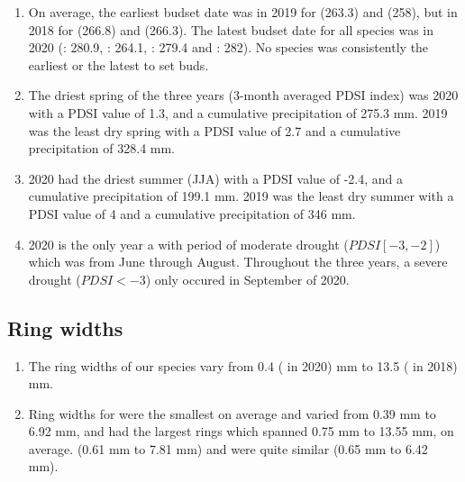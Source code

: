 \documentclass{article}\usepackage[]{graphicx}\usepackage[]{xcolor}
\begin{document}
\begin{enumerate}
\item On average, the earliest budset date was in 2019 for {\Ainc} 
(263.3) and 
{\Ball} (258), but in 2018 for
{\Bpap} (266.8) and 
{\Bpop} (266.3). 
The latest budset date for all species was in 2020
({\Ainc}: 280.9, 
{\Ball}: 264.1, 
{\Bpap}: 279.4 and 
{\Bpop}: 282).
No species was consistently the earliest or the latest to set buds.

\item The driest spring of the three years (3-month averaged PDSI index) was
2020 with a PDSI value of 
1.3, and a cumulative precipitation of 
275.3 mm.
2019 was the least dry spring with a PDSI value of 
2.7 and a cumulative precipitation of 328.4 mm.

\item 2020 had the driest summer (JJA) with a PDSI value of 
-2.4, and a cumulative precipitation of 
199.1 mm.
2019 was the least dry summer with a PDSI value of 
4 and a cumulative precipitation of 
346 mm.

\item 2020 is the only year a with period of moderate drought ($PDSI [-3, -2]$) which was from 
June through 
August. Throughout the three years, a severe drought ($PDSI < -3$) only occured in
September of 
2020.

\end{enumerate}

\subsection{Ring widths}
\begin{enumerate}
\item The ring widths of our species vary from 0.4 ({\Ball} in 2020) mm to 13.5 ({\Bpop} in 2018) mm. 
\item Ring widths for {\Ball} were the smallest on average and varied from 0.39 mm to 6.92 mm, and 
{\Bpop} had the largest rings which spanned 
0.75 mm to 13.55 mm, on average.
{\Ainc} (0.61 mm to 7.81 mm) and 
{\Bpap} were quite similar (0.65 mm to 6.42 mm).
\end{enumerate}

\end{document}
